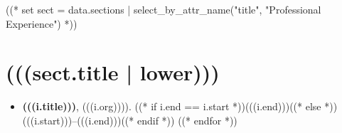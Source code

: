\documentclass[11pt,article,oneside]{memoir}
\begin{document}
((* set sect = data.sections | select_by_attr_name("title", "Professional Experience") *))
\section{(((sect.title | lower)))}

\mbox{}\vspace{-\dimexpr\baselineskip\relax}

\begin{itemize}[label={}]
  ((* for i in sect.entries.experience | sort_by_attr(["end", "start"], reverse=True) *))
  \item \textbf{(((i.title)))}, (((i.org)))). ((* if i.end == i.start *))(((i.end)))((* else *))(((i.start)))--(((i.end)))((* endif *))
        ((* endfor *))
\end{itemize}
\end{document}
